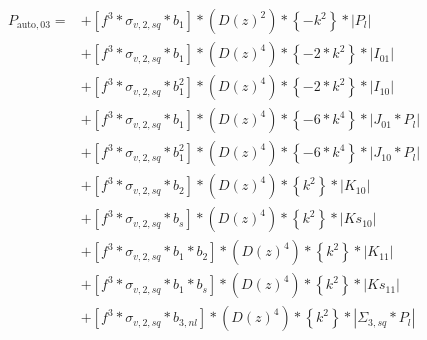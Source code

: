 \documentclass{article}
\begin{document}
\begin{equation}
\begin{aligned}          
P_{\mathrm{auto},03}=
&+\left[f^{3}*\sigma_{v,2,sq}*b_{1}\right]*\left(D(z)^{2}\right)*\left\{-k^{2}\right\}*\left|P_l\right| \\
&+\left[f^{3}*\sigma_{v,2,sq}*b_{1}\right]*\left(D(z)^{4}\right)*\left\{-2*k^{2}\right\}*\left|I_{01}\right| \\
&+\left[f^{3}*\sigma_{v,2,sq}*b_{1}^{2}\right]*\left(D(z)^{4}\right)*\left\{-2*k^{2}\right\}*\left|I_{10}\right| \\
&+\left[f^{3}*\sigma_{v,2,sq}*b_{1}\right]*\left(D(z)^{4}\right)*\left\{-6*k^{4}\right\}*\left|J_{01}*P_l\right| \\
&+\left[f^{3}*\sigma_{v,2,sq}*b_{1}^{2}\right]*\left(D(z)^{4}\right)*\left\{-6*k^{4}\right\}*\left|J_{10}*P_l\right| \\
&+\left[f^{3}*\sigma_{v,2,sq}*b_{2}\right]*\left(D(z)^{4}\right)*\left\{k^{2}\right\}*\left|K_{10}\right| \\
&+\left[f^{3}*\sigma_{v,2,sq}*b_{s}\right]*\left(D(z)^{4}\right)*\left\{k^{2}\right\}*\left|Ks_{10}\right| \\
&+\left[f^{3}*\sigma_{v,2,sq}*b_{1}*b_{2}\right]*\left(D(z)^{4}\right)*\left\{k^{2}\right\}*\left|K_{11}\right| \\
&+\left[f^{3}*\sigma_{v,2,sq}*b_{1}*b_{s}\right]*\left(D(z)^{4}\right)*\left\{k^{2}\right\}*\left|Ks_{11}\right| \\
&+\left[f^{3}*\sigma_{v,2,sq}*b_{3,nl}\right]*\left(D(z)^{4}\right)*\left\{k^{2}\right\}*\left|\Sigma_{3,sq}*P_l\right| \\
\end{aligned}
\end{equation}
\end{document}
